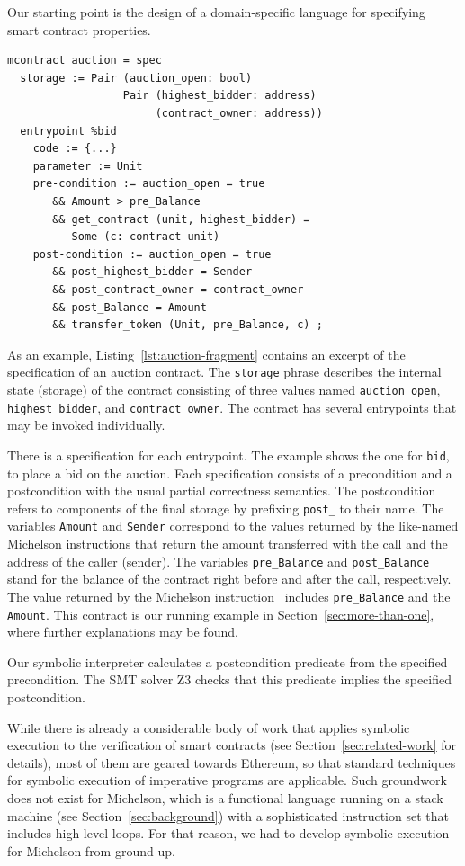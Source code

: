 \documentclass[a4paper,USenglish,cleveref, autoref,anonymous]{lipics-v2021}
\begin{document}
Our starting point is the design of a domain-specific language for
specifying smart contract properties.
\begin{lstlisting}[float=tp,captionpos=b,caption={Auction contract specification (excerpt)},label={lst:auction-fragment}]
mcontract auction = spec 
  storage := Pair (auction_open: bool) 
                  Pair (highest_bidder: address)
                       (contract_owner: address))
  entrypoint %bid
    code := {...}
    parameter := Unit 
    pre-condition := auction_open = true
       && Amount > pre_Balance 
       && get_contract (unit, highest_bidder) = 
          Some (c: contract unit)
    post-condition := auction_open = true
       && post_highest_bidder = Sender 
       && post_contract_owner = contract_owner 
       && post_Balance = Amount 
       && transfer_token (Unit, pre_Balance, c) ;
\end{lstlisting}
As an example, Listing~\ref{lst:auction-fragment} contains an excerpt
of the specification of an auction contract. The \texttt{storage}
phrase describes the internal state (storage) of the contract
consisting of three values named \lstinline|auction_open|,
\lstinline|highest_bidder|, and \lstinline|contract_owner|.
The contract has several entrypoints that may be invoked individually.

There is a specification for each entrypoint. The example shows the
one for  \lstinline|bid|, to place a bid on the auction. Each
specification consists of a precondition and a 
postcondition with the usual partial correctness semantics. The
postcondition refers to components of the final storage by prefixing
\lstinline|post_| to their name. The variables
\lstinline|Amount| and \lstinline|Sender| correspond to the values
returned by the like-named Michelson instructions that return the
amount transferred with the call and the address of the caller
(sender).  The variables \lstinline|pre_Balance| and
\lstinline|post_Balance| stand for the balance of the contract right
before and after the call, respectively. The value returned by the
Michelson instruction \BALANCE\ includes 
\lstinline|pre_Balance| and the \lstinline|Amount|.
This contract is our running example in
Section~\ref{sec:more-than-one}, where further explanations may be found.

Our symbolic interpreter calculates a postcondition predicate from the specified
precondition. The SMT solver Z3 \cite{z3} checks that this predicate
implies the specified postcondition.

While there is already a considerable body of work that applies
symbolic execution to the verification of smart contracts
\cite{securify, manticore,kevm,park} (see
Section~\ref{sec:related-work} for details), most of them are geared
towards Ethereum, so that standard techniques for symbolic execution
of imperative programs are applicable. Such groundwork does not exist
for Michelson, which is a functional language running on a stack
machine (see Section~\ref{sec:background}) with a sophisticated
instruction set that includes high-level loops. For that reason, we had to
develop symbolic execution for Michelson from ground up.
\end{document}
